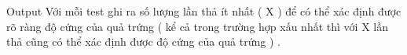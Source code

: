 Output
Với mỗi test ghi ra số lượng lần thả ít nhất ( X ) để có thể xác định được rõ ràng độ cứng của quả trứng ( kể cả trong trường hợp xấu nhất thì với X lần thả cũng có thể xác định được độ cứng của quả trứng ) .